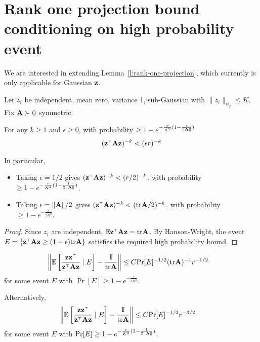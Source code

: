 \section{Rank one projection bound conditioning on high probability event}

We are interested in extending Lemma~\ref{l:rank-one-projection},
which currently is only applicable for Gaussian $\mathbf z$.

Let $z_i$ be independent, mean zero, variance 1, sub-Gaussian
with $\|z_i\|_{\psi_2} \leq K$.
Fix $\mathbf A \succ 0$ symmetric.

\begin{proposition}
  \label{prop:inv-moment-high-prob}
  For any $k \geq 1$ and $\epsilon \geq 0$,
  with probability $\geq 1 - e^{-\frac{r}{K^2} (1 - \frac{\epsilon}{\|\mathbf A\|})}$
  \begin{align*}
    (\z^\top \A \z)^{-k} < (\epsilon r)^{-k}
  \end{align*}

  In particular,
  \begin{itemize}
    \item
      Taking $\epsilon = 1/2$ gives
      $(\z^\top \A \z)^{-k} < (r / 2)^{-k}$.
      with probability $\geq 1 - e^{-\frac{r}{K^2}(1 - \frac{1}{2 \|\mathbf A\|})}$.
    \item
      Taking $\epsilon = \|\mathbf A\|/2$ gives
      $(\z^\top \A \z)^{-k} < (\tr \A / 2)^{-k}$.
      with probability $\geq 1 - e^{-\frac{r}{2 K^2}}$.
  \end{itemize}
\end{proposition}


\begin{proof}
  Since $z_i$ are independent, $\E \z^\top \A \z = \tr \A$.
  By Hanson-Wright,
  the event $E = \{ \z^\top \A \z \geq (1 - \epsilon) \tr \A \}$
  satisfies the required high probability bound.
\end{proof}

\begin{lemma}
  \begin{align*}
    \left\| \E \left[
      \frac{\z \z^\top}{\z^\top \A \z}
      \mid E
    \right] - \frac{\I}{\tr \A} \right\|
    &\leq C \Pr[E]^{-1/2} (\tr \A)^{-1} r^{-1/2}
  \end{align*}
  for some event $E$ with $\Pr[E] \geq 1 - e^{-\frac{r}{2 K^2}}$.

  Alternatively,
  \begin{align*}
    \left\| \E \left[
      \frac{\z \z^\top}{\z^\top \A \z}
      \mid E
    \right] - \frac{\I}{\tr \A} \right\|
    &\leq C \Pr[E]^{-1/2} r^{-3/2}
  \end{align*}
  for some event $E$ with $\mathrm{Pr}[E] \geq 1 - e^{-\frac{r}{K^2} (1 - \frac{1}{2 \|\mathbf A\|})}$.
\end{lemma}

